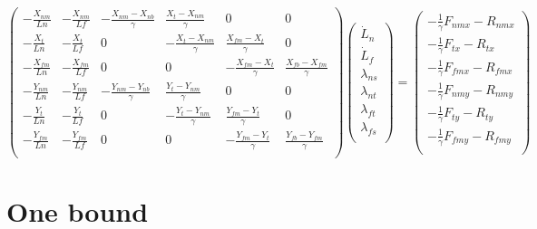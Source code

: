 \documentclass[11pt,twocolumn]{article}
\begin{document}
\[
\begin{pmatrix}
  -\frac{X_{nm}}{Ln} & -\frac{X_{nm}}{Lf}
  & -\frac{X_{nm}-X_{nb}}{\gamma} & \frac{X_{t}-X_{nm}}{\gamma} & 0 & 0\\
  -\frac{X_{t}}{Ln} & -\frac{X_{t}}{Lf}
  & 0 & -\frac{X_{t}-X_{nm}}{\gamma} & \frac{X_{fm}-X_{t}}{\gamma} & 0\\
  -\frac{X_{fm}}{Ln} & -\frac{X_{fm}}{Lf}
  & 0 & 0 & -\frac{X_{fm}-X_{t}}{\gamma} & \frac{X_{fb}-X_{fm}}{\gamma}\\
  -\frac{Y_{nm}}{Ln} & -\frac{Y_{nm}}{Lf}
  & -\frac{Y_{nm}-Y_{nb}}{\gamma} & \frac{Y_{t}-Y_{nm}}{\gamma} & 0 & 0\\
  -\frac{Y_{t}}{Ln} & -\frac{Y_{t}}{Lf}
  & 0 & -\frac{Y_{t}-Y_{nm}}{\gamma} & \frac{Y_{fm}-Y_{t}}{\gamma} & 0\\
  -\frac{Y_{fm}}{Ln} & -\frac{Y_{fm}}{Lf}
  & 0 & 0 & -\frac{Y_{fm}-Y_{t}}{\gamma} & \frac{Y_{fb}-Y_{fm}}{\gamma}\\
\end{pmatrix}
\begin{pmatrix}
  \dot{L}_n\\
  \dot{L}_f\\
  \lambda_{ns}\\
  \lambda_{nt}\\
  \lambda_{ft}\\
  \lambda_{fs}\\
\end{pmatrix}
=
\begin{pmatrix}
  -\frac{1}{\gamma}F_{nmx} - R_{nmx}\\
  -\frac{1}{\gamma}F_{tx}  - R_{tx}\\
  -\frac{1}{\gamma}F_{fmx} - R_{fmx}\\
  -\frac{1}{\gamma}F_{nmy} - R_{nmy}\\
  -\frac{1}{\gamma}F_{ty}  - R_{ty}\\
  -\frac{1}{\gamma}F_{fmy} - R_{fmy}\\
\end{pmatrix}
\]

\twocolumn

\section{One bound}
\end{document}
